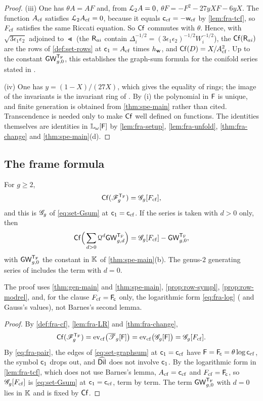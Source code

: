 \begin{proof}
(iii) One has $\theta A=AF$ and, from $\mathcal{L}_{2} A=0$, $\theta F=-F^2-27yXF-6yX$. The function $A_{\mathrm{cf}}$ satisfies $\mathcal{L}_{2}A_{\mathrm{cf}}=0$, because it equals $\mathsf{c}_{\mathrm{cf}}=-\mathsf{w}_{\mathrm{cf}}$ by \cref{lem:fra-tcf}, so $F_{\mathrm{cf}}$ satisfies the same Riccati equation. So $\mathsf{Cf}$ commutes with $\theta$. Hence, with $\sqrt{3\epsilon_1\epsilon_2}$ adjoined to $\Lt$ (the $\mathsf{R}_{ai}$ contain $\Delta_i^{-1/2}=(3\epsilon_1\epsilon_2)^{-1/2}W_i^{-1/2}$), the $\mathsf{Cf}(\mathsf{R}_{ai})$ are the rows of \cref{def:set-rows} at $\mathsf{c}_{1}=A_{\mathrm{cf}}$ times $h_{\mathbf{w}}$, and $\mathsf{Cf}(D)=X/A_{\mathrm{cf}}^2$. Up to the constant $\mathsf{GW}_{g,0}^{\mathsf{T}_{\mathrm{F}}}$, this establishes the graph-sum formula for the conifold series stated in \cite{BS}.

(iv) One has $y=(1-X)/(27X)$, which gives the equality of rings; the image of the invariants is the invariant ring of \cite{BS}. By (i) the polynomial in $\mathsf{F}$ is unique, and finite generation is obtained from \cref{thm:spe-main} rather than cited. Transcendence is needed only to make $\mathsf{Cf}$ well defined on functions. The identities themselves are identities in $\mathbb{L}_{\omega}[\mathsf{F}]$ by \cref{lem:fra-setup}, \cref{lem:fra-unfold}, \cref{thm:fra-change} and \cref{thm:spe-main}\textup{(d)}.
\end{proof}

\subsection{The frame formula}

\begin{prop}
\label{prop:fra-frame}
For $g\geq2$,
\[
\mathsf{Cf}(\mathscr{F}_g^{\mathsf{T}_{\mathrm{F}}})=\mathscr{G}_g[F_{\mathrm{cf}}],
\]
and this is $\mathscr{G}_g$ of \eqref{eq:set-Gsum} at $\mathsf{c}_{1}=\mathsf{c}_{\mathrm{cf}}$. If the series is taken with $d>0$ only, then
\[
\mathsf{Cf}\Big(\sum_{d>0}\mathcal{Q}^d\mathsf{GW}_{g,d}^{\mathsf{T}_{\mathrm{F}}}\Big)=\mathscr{G}_g[F_{\mathrm{cf}}]-\mathsf{GW}_{g,0}^{\mathsf{T}_{\mathrm{F}}},
\]
with $\mathsf{GW}_{g,0}^{\mathsf{T}_{\mathrm{F}}}$ the constant in $\mathbb{K}$ of \cref{thm:spe-main}\textup{(b)}. The genus-$2$ generating series of \cite{BS} includes the term with $d=0$.

The proof uses \cref{thm:gen-main} and \cref{thm:spe-main}, \cref{prop:row-sympl}, \cref{prop:row-modrel}, \cite[Definitions~2.2, 2.5, 2.13 and Proposition~2.14]{PPZ15} and, for the clause $F_{\mathrm{cf}}=\mathsf{F}_{\!\mathsf{c}}$ only, the logarithmic form \eqref{eq:fra-log} (\cite[Eq.~15.6.7]{DLMF} and Gauss's values), not Barnes's second lemma.
\end{prop}

\begin{proof}
By \cref{def:fra-cf}, \cref{lem:fra-LR} and \cref{thm:fra-change},
\[
\mathsf{Cf}(\mathscr{F}_g^{\mathsf{T}_{\mathrm{F}}})=\mathrm{ev}_{\mathrm{cf}}\big(\overline{\mathscr{T}}_g[\mathsf{F}]\big)=\mathrm{ev}_{\mathrm{cf}}\big(\mathscr{G}_g[\mathsf{F}]\big)=\mathscr{G}_g[F_{\mathrm{cf}}].
\]
By \eqref{eq:fra-pair}, the edges of \eqref{eq:set-graphsum} at $\mathsf{c}_{1}=\mathsf{c}_{\mathrm{cf}}$ have $\mathsf{F}=\mathsf{F}_{\!\mathsf{c}}=\theta\log\mathsf{c}_{\mathrm{cf}}$, the symbol $\mathsf{c}_{1}$ drops out, and $\widehat{\mathsf{Dil}}$ does not involve $\mathsf{c}_{1}$. By the logarithmic form in \cref{lem:fra-tcf}, which does not use Barnes's lemma, $A_{\mathrm{cf}}=\mathsf{c}_{\mathrm{cf}}$ and $F_{\mathrm{cf}}=\mathsf{F}_{\!\mathsf{c}}$, so $\mathscr{G}_g[F_{\mathrm{cf}}]$ is \eqref{eq:set-Gsum} at $\mathsf{c}_{1}=\mathsf{c}_{\mathrm{cf}}$, term by term. The term $\mathsf{GW}_{g,0}^{\mathsf{T}_{\mathrm{F}}}$ with $d=0$ lies in $\mathbb{K}$ and is fixed by $\mathsf{Cf}$.
\end{proof}
